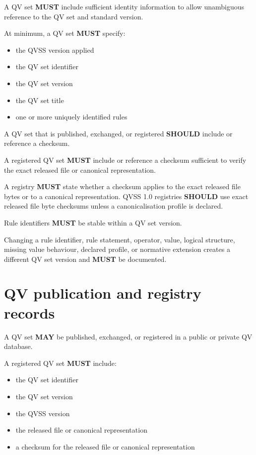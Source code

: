 \documentclass[11pt,a4paper]{article}
\begin{document}
A QV set \textbf{MUST} include sufficient identity information to allow unambiguous reference to the QV set and standard version.

At minimum, a QV set \textbf{MUST} specify:

\begin{itemize}
\item the QVSS version applied
\item the QV set identifier
\item the QV set version
\item the QV set title
\item one or more uniquely identified rules
\end{itemize}

A QV set that is published, exchanged, or registered \textbf{SHOULD} include or reference a checksum.

A registered QV set \textbf{MUST} include or reference a checksum sufficient to verify the exact released file or canonical representation.

A registry \textbf{MUST} state whether a checksum applies to the exact released file bytes or to a canonical representation. QVSS 1.0 registries \textbf{SHOULD} use exact released file byte checksums unless a canonicalisation profile is declared.

Rule identifiers \textbf{MUST} be stable within a QV set version.

Changing a rule identifier, rule statement, operator, value, logical structure, missing value behaviour, declared profile, or normative extension creates a different QV set version and \textbf{MUST} be documented.

\section{QV publication and registry records}

A QV set \textbf{MAY} be published, exchanged, or registered in a public or private QV database.

A registered QV set \textbf{MUST} include:

\begin{itemize}
\item the QV set identifier
\item the QV set version
\item the QVSS version
\item the released file or canonical representation
\item a checksum for the released file or canonical representation
\end{itemize}
\end{document}

